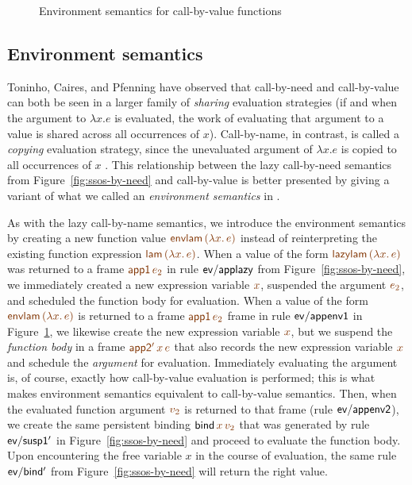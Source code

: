 \begin{figure}
\caption{Environment semantics for call-by-value functions}
\label{fig:ssos-by-env}
\end{figure}

\subsection{Environment semantics}

Toninho, Caires, and Pfenning have observed that call-by-need and
call-by-value can both be seen in a larger family of {\it sharing}
evaluation strategies (if and when the argument to $\lambda x. e$ is
evaluated, the work of evaluating that argument to a value is shared
across all occurrences of $x$). Call-by-name, in contrast, is called a
{\it copying} evaluation strategy, since the unevaluated argument of
$\lambda x. e$ is copied to all occurrences of $x$
\cite{toninho12functions}. This relationship between the lazy
call-by-need semantics from Figure~\ref{fig:ssos-by-need} and
call-by-value is better presented by giving a variant of what we
called an {\it environment semantics} in
\cite{pfenning09substructural}.


As with the lazy call-by-name semantics, we introduce the environment
semantics by creating a new function value $\lf{{\sf envlam}\,(\lambda
  x.\,e)}$ instead of reinterpreting the existing function expression
$\lf{{\sf lam}\,(\lambda x.\,e)}$. When a value of the form $\lf{{\sf
    lazylam}\,(\lambda x.\,e)}$ was returned to a frame $\lf{{\sf
    app1}\,e_2}$ in rule ${\sf ev/applazy}$ from
Figure~\ref{fig:ssos-by-need}, we immediately created a new expression
variable $\lf{x}$, suspended the argument $\lf{e_2}$, and scheduled the
function body for evaluation. When a value of the form $\lf{{\sf
    envlam}\,(\lambda x.\,e)}$ is returned to a frame $\lf{{\sf
    app1}\,e_2}$ frame in rule ${\sf ev/appenv1}$ in
Figure~\ref{fig:ssos-by-env}, we likewise create the new expression
variable $\lf{x}$, but we suspend the {\it function body} in a frame
$\lf{{\sf app2'}\,x\,e}$ that also records the new expression variable
$\lf{x}$ and schedule the {\it argument} for evaluation. Immediately
evaluating the argument is, of course, exactly how call-by-value
evaluation is performed; this is what makes environment semantics
equivalent to call-by-value semantics.
Then, when the evaluated
function argument $\lf{v_2}$ is returned to that frame (rule ${\sf
  ev/appenv2}$), we create the same persistent binding ${\sf
  bind}\,\lf{x}\,\lf{v_2}$ that was generated by rule ${\sf ev/susp1'}$ in
Figure~\ref{fig:ssos-by-need} and proceed to evaluate the function
body. Upon encountering the free variable $x$ in the course of
evaluation, the same rule ${\sf ev/bind'}$ from
Figure~\ref{fig:ssos-by-need} will return the right value.

